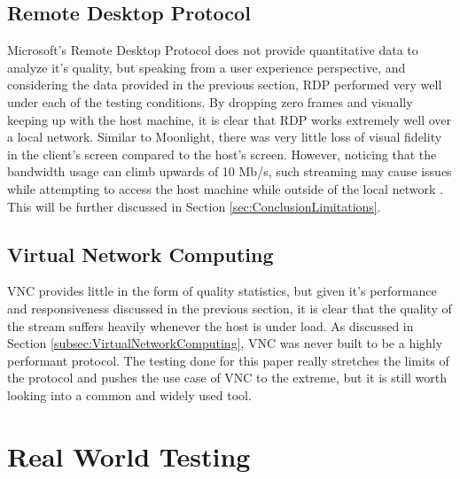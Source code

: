 \subsection{Remote Desktop Protocol}\label{subsec:QualityRDP}

Microsoft's Remote Desktop Protocol does not provide quantitative data to analyze it's quality, but speaking from a user experience perspective, and considering the data provided in the previous section, RDP performed very well under each of the testing conditions.
By dropping zero frames and visually keeping up with the host machine, it is clear that RDP works extremely well over a local network.
Similar to Moonlight, there was very little loss of visual fidelity in the client's screen compared to the host's screen.
However, noticing that the bandwidth usage can climb upwards of 10 Mb/s, such streaming may cause issues while attempting to access the host machine while outside of the local network \cite{rdp_bandwidth}.
This will be further discussed in Section \ref{sec:ConclusionLimitations}.

\subsection{Virtual Network Computing}\label{subsec:QualityVNC}

VNC provides little in the form of quality statistics, but given it's performance and responsiveness discussed in the previous section, it is clear that the quality of the stream suffers heavily whenever the host is under load.
As discussed in Section \ref{subsec:VirtualNetworkComputing}, VNC was never built to be a highly performant protocol.
The testing done for this paper really stretches the limits of the protocol and pushes the use case of VNC to the extreme, but it is still worth looking into a common and widely used tool.

\section{Real World Testing}\label{sec:RealWorldTesting}

